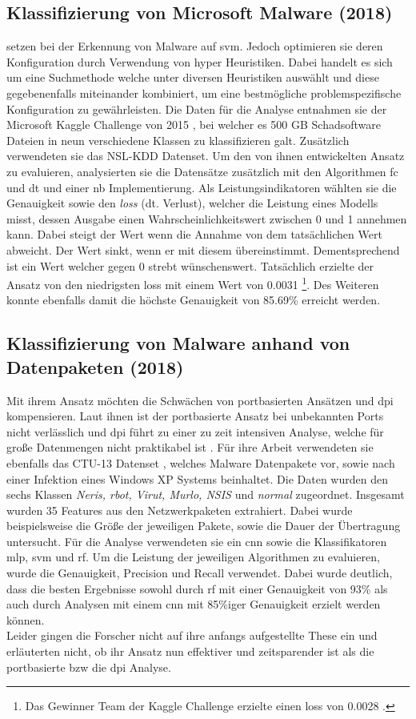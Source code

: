 \documentclass[
    12pt, %
    DIV10,
    ngerman, %
    a4paper, %
    oneside, %
    titlepage, %
    parskip=half, %
    headings=normal, %
    listof=totoc, %
    bibliography=totoc, %
    index=totoc, %
    captions=tableheading, %
    final %
]{scrreprt}
\begin{document}
\subsection{Klassifizierung von Microsoft Malware (2018)}\label{sabar}
\textcite{Sabar2018} setzen bei der Erkennung von Malware auf \ac{svm}. Jedoch optimieren sie deren Konfiguration durch Verwendung von hyper Heuristiken. Dabei handelt es sich um eine Suchmethode welche unter diversen Heuristiken auswählt und diese gegebenenfalls miteinander kombiniert, um eine bestmögliche problemspezifische Konfiguration zu gewährleisten. Die Daten für die Analyse entnahmen sie der Microsoft Kaggle Challenge von 2015 \parencite{Kaggle}, bei welcher es 500 GB Schadsoftware Dateien in neun verschiedene Klassen zu klassifizieren galt. Zusätzlich verwendeten sie das NSL-KDD Datenset. Um den von ihnen entwickelten Ansatz zu evaluieren, analysierten sie die Datensätze zusätzlich mit den Algorithmen \ac{fc} und \ac{dt} und einer \ac{nb} Implementierung. Als Leistungsindikatoren wählten sie die Genauigkeit sowie den \emph{loss} (dt. Verlust), welcher die Leistung eines Modells misst, dessen Ausgabe einen Wahrscheinlichkeitswert zwischen 0 und 1 annehmen kann. Dabei steigt der Wert wenn die Annahme von dem tatsächlichen Wert abweicht. Der Wert sinkt, wenn er mit diesem übereinstimmt. Dementsprechend ist ein Wert welcher gegen 0 strebt wünschenswert. Tatsächlich erzielte der Ansatz von \textcite{Sabar2018} den niedrigsten loss mit einem Wert von 0.0031 \footnote{Das Gewinner Team der Kaggle Challenge erzielte einen loss von 0.0028 \parencite{leader}.}. Des Weiteren konnte ebenfalls damit die höchste Genauigkeit von 85.69\% erreicht werden.
%
\subsection{Klassifizierung von Malware anhand von Datenpaketen (2018)}
Mit ihrem Ansatz möchten \textcite{Yeo2018} die Schwächen von portbasierten Ansätzen und \ac{dpi} kompensieren. Laut ihnen ist der portbasierte Ansatz bei unbekannten Ports nicht verlässlich und \ac{dpi} führt zu einer zu zeit intensiven Analyse, welche für gro{\ss}e Datenmengen nicht praktikabel ist \parencite{dharmapurikar2003deep}. Für ihre Arbeit verwendeten sie ebenfalls das CTU-13 Datenset \parencite{garcia2014empirical}, welches Malware Datenpakete vor, sowie nach einer Infektion eines Windows XP Systems beinhaltet. Die Daten wurden den sechs Klassen \emph{Neris, rbot, Virut, Murlo, NSIS} und \emph{normal} zugeordnet. Insgesamt wurden 35 Features aus den Netzwerkpaketen extrahiert. Dabei wurde beispielsweise die Grö{\ss}e der jeweiligen Pakete, sowie die Dauer der Übertragung untersucht. Für die Analyse verwendeten sie ein \ac{cnn} sowie die Klassifikatoren \ac{mlp}, \ac{svm} und \ac{rf}. Um die Leistung der jeweiligen Algorithmen zu evaluieren, wurde die Genauigkeit, Precision und Recall verwendet. Dabei wurde deutlich, dass die besten Ergebnisse sowohl durch \ac{rf} mit einer Genauigkeit von 93\% als auch durch Analysen mit einem \ac{cnn} mit 85\%iger Genauigkeit erzielt werden können. \\
Leider gingen die Forscher nicht auf ihre anfangs aufgestellte These ein und erläuterten nicht, ob ihr Ansatz nun effektiver und zeitsparender ist als die portbasierte bzw die \ac{dpi} Analyse.
%
\end{document}
